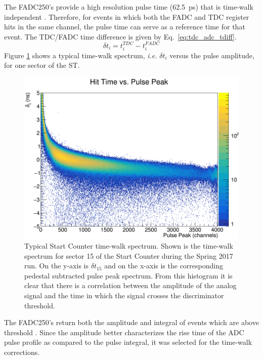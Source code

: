 The FADC250's provide a high resolution pulse time (62.5~ps) that is time-walk independent \cite{pooser16} \cite{dong_fadc}.  
Therefore, for events in which both the FADC and TDC register hits in the same channel, the pulse time can serve as a reference time for that event.  The TDC/FADC time difference is given by Eq.~\ref{eq:tdc_adc_tdiff}.
	\begin{equation} \label{eq:tdc_adc_tdiff}
		\delta t_{i} = t^{TDC}_{i} - t^{FADC}_{i}
	\end{equation}
Figure \ref{fig:twdistuncorrch15} shows a typical time-walk spectrum, \textit{i.e.} $\delta t_{i}$ versus the pulse amplitude, for one sector of the ST.
	\begin{figure}[!htb]
		\centering
		\includegraphics[width=1.0\columnwidth]{calibration/figs/tw_dist_uncorr_ch15}
		\caption{Typical Start Counter time-walk spectrum.  Shown is the time-walk spectrum for sector 15 of the Start Counter during the Spring 2017 run. On the y-axis is $\delta t_{15}$ and on the x-axis is the corresponding pedestal subtracted pulse peak spectrum. From this histogram it is clear that there is a correlation between the amplitude of the analog signal and the time in which the signal crosses the discriminator threshold.}
		\label{fig:twdistuncorrch15}
	\end{figure}
The FADC250's return both the amplitude and integral of events which are above threshold \cite{dong_fadc}.  Since the amplitude better characterizes the rise time of the ADC pulse profile as compared to the pulse integral, it was selected for the time-walk corrections.

